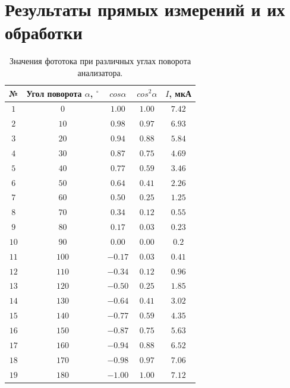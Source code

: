 \documentclass{article}
\begin{document}
\section{Результаты прямых измерений и их обработки}
\begin{table}[h]
    \centering
    \bgroup
    \def\arraystretch{1.4}
    \begin{tabular}{|c|c|c|c|c|}
        \hline
        № & Угол поворота $\alpha$, $^\circ$ & $cos\alpha$ & $cos^2\alpha$ & $I$, мкА \\ \hline
        $ 1 $ & $ 0 $ & $ 1.00 $ & $ 1.00 $ & $ 7.42 $\\ \hline
        $ 2 $ & $ 10 $ & $ 0.98 $ & $ 0.97 $ & $ 6.93 $\\ \hline
        $ 3 $ & $ 20 $ & $ 0.94 $ & $ 0.88 $ & $ 5.84 $\\ \hline
        $ 4 $ & $ 30 $ & $ 0.87 $ & $ 0.75 $ & $ 4.69 $\\ \hline
        $ 5 $ & $ 40 $ & $ 0.77 $ & $ 0.59 $ & $ 3.46 $\\ \hline
        $ 6 $ & $ 50 $ & $ 0.64 $ & $ 0.41 $ & $ 2.26 $\\ \hline
        $ 7 $ & $ 60 $ & $ 0.50 $ & $ 0.25 $ & $ 1.25 $\\ \hline
        $ 8 $ & $ 70 $ & $ 0.34 $ & $ 0.12 $ & $ 0.55 $\\ \hline
        $ 9 $ & $ 80 $ & $ 0.17 $ & $ 0.03 $ & $ 0.23 $\\ \hline
        $ 10 $ & $ 90 $ & $ 0.00 $ & $ 0.00 $ & $ 0.2 $\\ \hline
        $ 11 $ & $ 100 $ & $ -0.17 $ & $ 0.03 $ & $ 0.41 $\\ \hline
        $ 12 $ & $ 110 $ & $ -0.34 $ & $ 0.12 $ & $ 0.96 $\\ \hline
        $ 13 $ & $ 120 $ & $ -0.50 $ & $ 0.25 $ & $ 1.85 $\\ \hline
        $ 14 $ & $ 130 $ & $ -0.64 $ & $ 0.41 $ & $ 3.02 $\\ \hline
        $ 15 $ & $ 140 $ & $ -0.77 $ & $ 0.59 $ & $ 4.35 $\\ \hline
        $ 16 $ & $ 150 $ & $ -0.87 $ & $ 0.75 $ & $ 5.63 $\\ \hline
        $ 17 $ & $ 160 $ & $ -0.94 $ & $ 0.88 $ & $ 6.52 $\\ \hline
        $ 18 $ & $ 170 $ & $ -0.98 $ & $ 0.97 $ & $ 7.06 $\\ \hline
        $ 19 $ & $ 180 $ & $ -1.00 $ & $ 1.00 $ & $ 7.12 $\\ \hline
    \end{tabular}
    \egroup
    \caption{Значения фототока при различных углах поворота анализатора.} 
\end{table}
\end{document}
